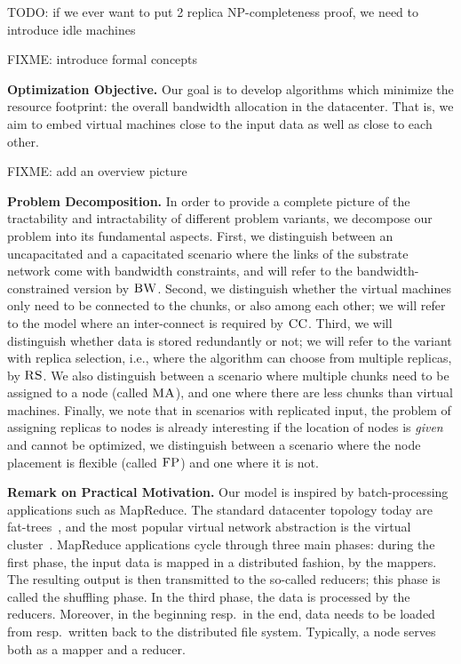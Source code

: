 \documentclass[9pt,twocolumn]{scrartcl}
\newcommand{\CC}{\textsc{CC}}
\newcommand{\FP}{\textsc{FP}}
\newcommand{\RS}{\textsc{RS}}
\newcommand{\BW}{\textsc{BW}}
\newcommand{\MA}{\textsc{MA}}
\begin{document}
TODO: if we ever want to put 2 replica NP-completeness proof, we need to introduce idle machines 

FIXME: introduce formal concepts

\textbf{Optimization Objective.} Our goal is to develop algorithms which minimize
the resource footprint: the overall bandwidth allocation in the datacenter. That is,
we aim to embed virtual machines close to the input data as well as close to
each other.

FIXME: add an overview picture

\textbf{Problem Decomposition.}
In order to provide a complete picture of the tractability and intractability of different
problem variants, we decompose our problem into its fundamental aspects.
First, we distinguish between an uncapacitated and a capacitated scenario where the links of the substrate network come with bandwidth
constraints, and will refer to the bandwidth-constrained version by $\BW$.
Second, we distinguish whether the virtual machines only need to be connected to the chunks, or also
among each other; we will refer to the model where an inter-connect is required
by $\CC$.
Third, we will distinguish whether data is stored redundantly or not; we will refer to the variant
with replica selection, i.e., where the algorithm can choose from multiple replicas, by $\RS$.
We also distinguish between a scenario where multiple chunks need to be assigned to a node
(called $\MA$), and one where there are less chunks than virtual machines.
Finally, we note that in scenarios with replicated input, the problem of assigning replicas
to nodes is already interesting if the location of nodes is \emph{given} and cannot be optimized,
we distinguish between a scenario where the node placement is flexible (called $\FP$) and one where
it is not.

\textbf{Remark on Practical Motivation.}
Our model is inspired by batch-processing applications such as MapReduce.
The standard datacenter topology today are fat-trees~\cite{fattree},
and the most popular virtual network abstraction is the virtual cluster~\cite{oktopus}.
MapReduce applications cycle through three main phases: during the first phase,
the input data is mapped in a distributed fashion, by the mappers.
The resulting output is then transmitted to the so-called reducers; this phase is
called the shuffling phase. In the third phase, the data is processed by the reducers.
Moreover, in the beginning resp.~in the end, data needs to be loaded from resp.~written
back to the distributed file system.
Typically, a node serves both as a mapper and a reducer.
\end{document}
